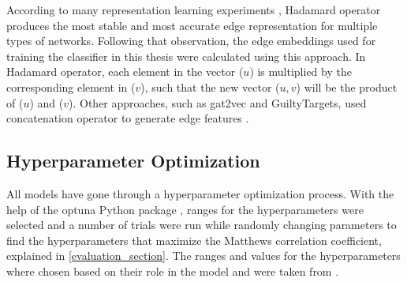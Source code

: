 According to many representation learning experiments \cite{grover_node2vec:_2016, tsitsulin_verse:_2018, yuan_sne:_2017}, Hadamard operator produces the most stable and most accurate edge representation for multiple types of networks.
Following that observation, the edge embeddings used for training the classifier in this thesis were calculated using this approach.
In Hadamard operator, each element in the vector ($u$) is multiplied by the corresponding element in ($v$), such that the new vector ($u,v$) will be the product of ($u$) and ($v$).
Other approaches, such as gat2vec and GuiltyTargets, used concatenation operator to generate edge features \cite{muslu_guiltytargets:_2019, sheikh_gat2vec:_2018}.

\subsection{Hyperparameter Optimization}

All models have gone through a hyperparameter optimization process.
With the help of the optuna Python package \cite{akiba_optuna:_2019}, ranges for the hyperparameters were selected and a number of trials were run while randomly changing parameters to find the hyperparameters that maximize the Matthews correlation coefficient, explained in \ref{evaluation_section}.
The ranges and values for the hyperparameters where chosen based on their role in the model and were taken from \cite{yue_graph_2019}.


